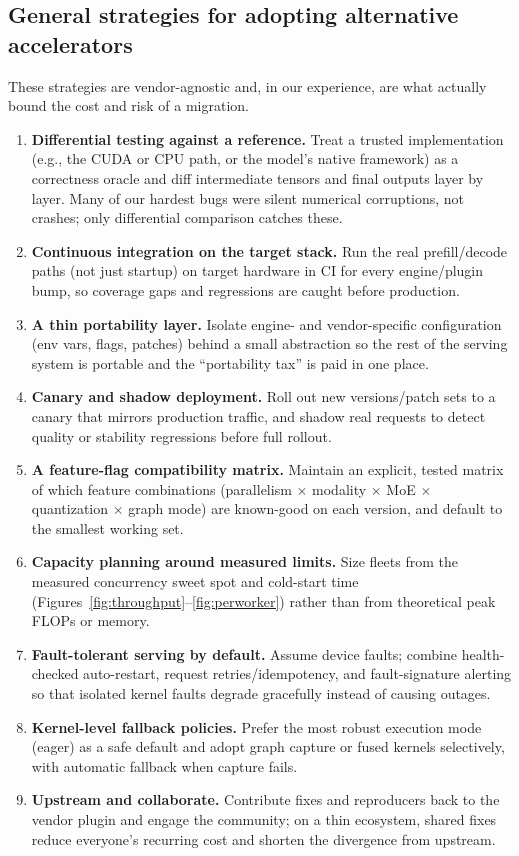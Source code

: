 \documentclass{article}
\begin{document}
\subsection{General strategies for adopting alternative accelerators}
These strategies are vendor-agnostic and, in our experience, are what actually
bound the cost and risk of a migration.
\begin{enumerate}
  \item \textbf{Differential testing against a reference.} Treat a trusted
        implementation (e.g., the CUDA or CPU path, or the model's native
        framework) as a correctness oracle and diff intermediate tensors and final
        outputs layer by layer. Many of our hardest bugs were silent numerical
        corruptions, not crashes; only differential comparison catches these.
  \item \textbf{Continuous integration on the target stack.} Run the real
        prefill/decode paths (not just startup) on target hardware in CI for every
        engine/plugin bump, so coverage gaps and regressions are caught before
        production.
  \item \textbf{A thin portability layer.} Isolate engine- and vendor-specific
        configuration (env vars, flags, patches) behind a small abstraction so the
        rest of the serving system is portable and the ``portability tax'' is paid
        in one place.
  \item \textbf{Canary and shadow deployment.} Roll out new versions/patch sets to
        a canary that mirrors production traffic, and shadow real requests to
        detect quality or stability regressions before full rollout.
  \item \textbf{A feature-flag compatibility matrix.} Maintain an explicit,
        tested matrix of which feature combinations (parallelism $\times$ modality
        $\times$ MoE $\times$ quantization $\times$ graph mode) are known-good on
        each version, and default to the smallest working set.
  \item \textbf{Capacity planning around measured limits.} Size fleets from the
        measured concurrency sweet spot and cold-start time
        (Figures~\ref{fig:throughput}--\ref{fig:perworker}) rather than from
        theoretical peak FLOPs or memory.
  \item \textbf{Fault-tolerant serving by default.} Assume device faults; combine
        health-checked auto-restart, request retries/idempotency, and
        fault-signature alerting so that isolated kernel faults degrade gracefully
        instead of causing outages.
  \item \textbf{Kernel-level fallback policies.} Prefer the most robust execution
        mode (eager) as a safe default and adopt graph capture or fused kernels
        selectively, with automatic fallback when capture fails.
  \item \textbf{Upstream and collaborate.} Contribute fixes and reproducers back to
        the vendor plugin and engage the community; on a thin ecosystem, shared
        fixes reduce everyone's recurring cost and shorten the divergence from
        upstream.
\end{enumerate}
\end{document}
